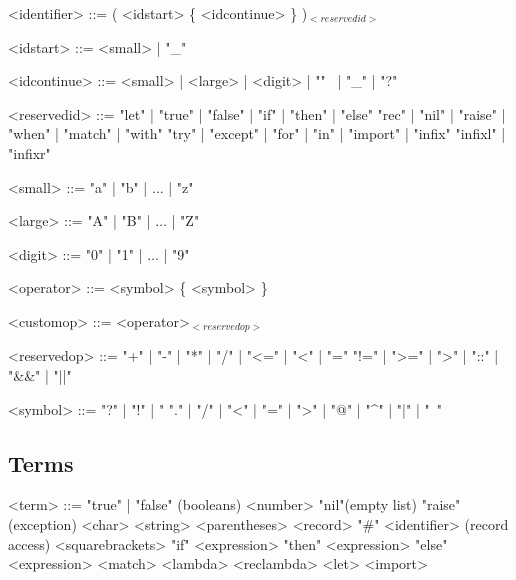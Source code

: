\documentclass{article}
\begin{document}
\begin{grammar}
  <identifier> ::= ( <idstart> \{ <idcontinue> \} )$_{<reservedid>}$

  <idstart> ::= <small> | "_"

  <idcontinue> ::= <small> | <large> | <digit> | "\textquotesingle" \ | "_" | "?"
\end{grammar}

\begin{grammar}
  <reservedid> ::= "let" | "true" | "false" | "if" | "then" | "else"
  \alt "rec" | "nil" | "raise" | "when" | "match" | "with"
  \alt "try" | "except" | "for" | "in" | "import" | "infix"
  \alt "infixl" | "infixr"
\end{grammar}

\begin{grammar}
  <small> ::= "a" | "b" | $\ldots$ | "z"

  <large> ::= "A" | "B" | $\ldots$ | "Z"

  <digit> ::= "0" | "1" | $\ldots$ | "9"
\end{grammar}

\begin{grammar}
  <operator> ::= <symbol> \{ <symbol> \}

  <customop> ::= <operator>$_{<reservedop>}$

  <reservedop> ::= "+" | "-" | "*" | "/" | "<=" | "<" | "="
  \alt "!=" | ">=" | ">" | "::" | "&&" | "||"

  <symbol> ::= "?" | "!" | "%
  \alt "." | "/" | "<" | "=" | ">" | "@" | "^" | "|" | "~"
\end{grammar}

\newpage

\subsection{Terms}

\begin{grammar}
  <term> ::= "true" | "false" \hfill (booleans)
  \alt <number>
  \alt "nil"\hfill (empty list)
  \alt "raise" \hfill (exception)
  \alt <char>
  \alt <string>
  \alt <parentheses>
  \alt <record>
  \alt "#" <identifier> \hfill (record access)
  \alt <squarebrackets>
  \alt "if" \textvisiblespace <expression> "then" \textvisiblespace <expression> "else" \textvisiblespace <expression>
  \alt <match>
  \alt <lambda>
  \alt <reclambda>
  \alt <let>
  \alt <import>
\end{grammar}
\end{document}
